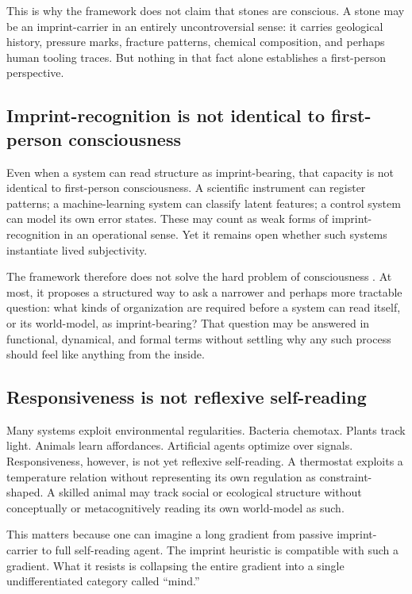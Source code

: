 \documentclass[12pt,a4paper]{article}
\begin{document}
This is why the framework does not claim that stones are conscious. A stone may be an imprint-carrier in an entirely uncontroversial sense: it carries geological history, pressure marks, fracture patterns, chemical composition, and perhaps human tooling traces. But nothing in that fact alone establishes a first-person perspective.

\subsection{Imprint-recognition is not identical to first-person consciousness}

Even when a system can read structure as imprint-bearing, that capacity is not identical to first-person consciousness. A scientific instrument can register patterns; a machine-learning system can classify latent features; a control system can model its own error states. These may count as weak forms of imprint-recognition in an operational sense. Yet it remains open whether such systems instantiate lived subjectivity.

The framework therefore does not solve the hard problem of consciousness \cite{Levine1983,Chalmers1996}. At most, it proposes a structured way to ask a narrower and perhaps more tractable question: what kinds of organization are required before a system can read itself, or its world-model, as imprint-bearing? That question may be answered in functional, dynamical, and formal terms without settling why any such process should feel like anything from the inside.

\subsection{Responsiveness is not reflexive self-reading}

Many systems exploit environmental regularities. Bacteria chemotax. Plants track light. Animals learn affordances. Artificial agents optimize over signals. Responsiveness, however, is not yet reflexive self-reading. A thermostat exploits a temperature relation without representing its own regulation as constraint-shaped. A skilled animal may track social or ecological structure without conceptually or metacognitively reading its own world-model as such.

This matters because one can imagine a long gradient from passive imprint-carrier to full self-reading agent. The imprint heuristic is compatible with such a gradient. What it resists is collapsing the entire gradient into a single undifferentiated category called ``mind.''
\end{document}
